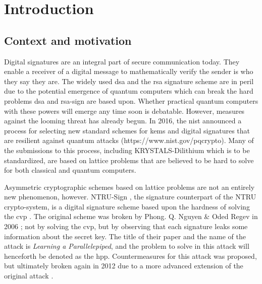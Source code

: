\newcommand{\PP}[2][]{\mathcal{P}_{#1}(\mat{#2})}
\newcommand{\mat}[1]{\mathbf{#1}}
\renewcommand{\vec}[1]{\mathbf{#1}}
\newcommand{\GLnR}{\mathcal{GL}_{n}(\mathbb{R})}
\newcommand{\normdist}[2]{\mathcal{N}(#1, #2^2)}
\newcommand{\dgdist}{\mathcal{D}_{2\bb{Z}+c, \sigma}}
\newcommand{\bb}[1]{\mathbb{#1}}
\newcommand{\dgd}{\mathcal{D}}
\newcommand{\dgdi}{\widehat{\mathcal{D}}}
\newcommand{\mom}[2]{mom_{#1, \mathbf{#2}}(\mathbf{w})}


\chapter{Introduction}
\section{Context and motivation}
Digital signatures are an integral part of secure communication today. They enable a receiver of a digital message to mathematically verify the sender is who they say they are. 
The widely used \gls{dsa} and the \gls{rsa} 
signature scheme are in peril due to the potential emergence of quantum computers which can break the hard problems \gls{dsa} and \gls{rsa}-sign are based upon.
Whether practical quantum computers with these powers will emerge any time soon is debatable. However, measures against the looming threat has already begun. 
In 2016, the \gls{nist} announced a process for selecting new standard schemes for \gls{kems} and 
digital signatures that are resilient against quantum attacks (https://www.nist.gov/pqcrypto). Many of the submissions to this process, including KRYSTALS-Dilithium which is to be standardized, 
are based on lattice problems that are believed to be hard to solve for both classical and quantum computers.

Asymmetric cryptographic schemes based on lattice problems are not an entirely new phenomenon, however. NTRU-Sign \cite{HHPSW03}, the signature counterpart of the NTRU crypto-system,
is a digital signature scheme based upon the hardness of solving the \gls{cvp} \cite{ENCYCLOPEDIA}.
The original scheme was broken by Phong. Q. Nguyen \& Oded Regev in 2006 \cite{NR09}; not by solving the \gls{cvp}, but by observing that each signature leaks some information about the secret key.
The title of their paper and the name of the attack is \textit{Learning a Parallelepiped}, and the problem to solve in this attack will henceforth be denoted as the \gls{hpp}. %
Countermeasures for this attack was proposed, but ultimately broken again in 2012 due to a more advanced extension of the original attack \cite{DN12}. 

